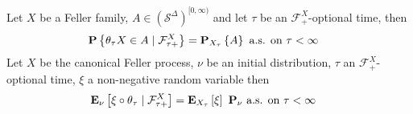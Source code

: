 \begin{thm}\label{StrongMarkovFellerProcess} Let $X$ be a Feller family, $A \in (\mathcal{S}^\Delta)^{[0,\infty)}$  and let $\tau$ be an $\mathcal{F}^X_+$-optional time, then
\begin{align*}
\cprobability{\mathcal{F}^X_{\tau+}}{\theta_{\tau} X \in A} &= \sprobability{A}{X_\tau} \text{ a.s. on $\tau < \infty$}
\end{align*}
Let $X$ be the canonical Feller process, $\nu$ be an initial distribution, $\tau$ an $\mathcal{F}^X_+$-optional time, $\xi$ a non-negative random variable then
\begin{align*}
\csexpectationlong{\mathcal{F}^X_{\tau+}}{\xi \circ \theta_{\tau} }{\nu} &= \sexpectation{\xi}{X_\tau} \text{ $\sprobabilityop{\nu}$ a.s. on $\tau < \infty$}
\end{align*}
\end{thm}
